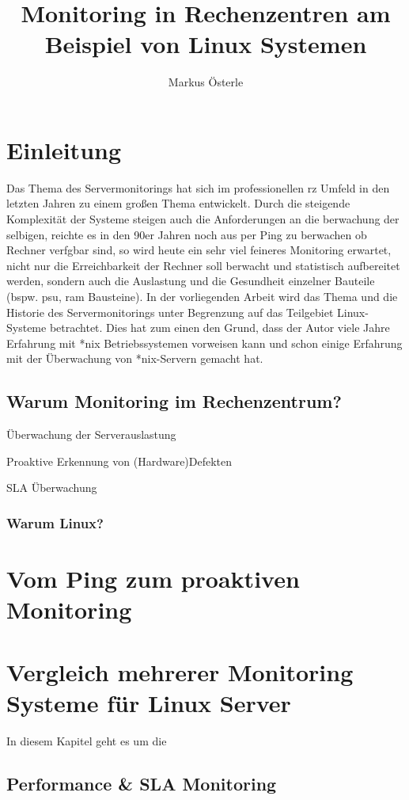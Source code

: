 \documentclass[12pt,a4paper]{report}
\author{Markus Österle}
\title{Monitoring in Rechenzentren am Beispiel von Linux Systemen}
\date{} %
\begin{document}
	\maketitle
	\setcounter{tocdepth}{3}
	\tableofcontents
	\chapter{Einleitung}
	Das Thema des Servermonitorings hat sich im professionellen \acrshort{rz} Umfeld in den letzten Jahren zu einem großen Thema entwickelt. Durch die steigende Komplexität der Systeme steigen auch die Anforderungen an die berwachung der selbigen, reichte es in den 90er Jahren noch aus per Ping zu berwachen ob Rechner verfgbar sind, so wird heute ein sehr viel feineres Monitoring erwartet, nicht nur die Erreichbarkeit der Rechner soll berwacht und statistisch aufbereitet werden, sondern auch die Auslastung und die Gesundheit einzelner Bauteile (bspw. \gls{psu}, \acrshort{ram} Bausteine). In der vorliegenden Arbeit wird das Thema und die Historie des Servermonitorings unter Begrenzung auf das Teilgebiet Linux-Systeme betrachtet. Dies hat zum einen den Grund, dass der Autor viele Jahre Erfahrung mit *nix Betriebssystemen vorweisen kann und schon einige Erfahrung mit der Überwachung von *nix-Servern gemacht hat.
	\section{Warum Monitoring im Rechenzentrum?}
		Überwachung der Serverauslastung
		
		Proaktive Erkennung von (Hardware)Defekten
		
		SLA Überwachung
		\subsection{Warum Linux?}
	
	\chapter{Vom Ping zum proaktiven Monitoring}
	\chapter{Vergleich mehrerer Monitoring Systeme für Linux Server}
	In diesem Kapitel geht es um die 
	\section{Performance \& SLA Monitoring}
\end{document}
